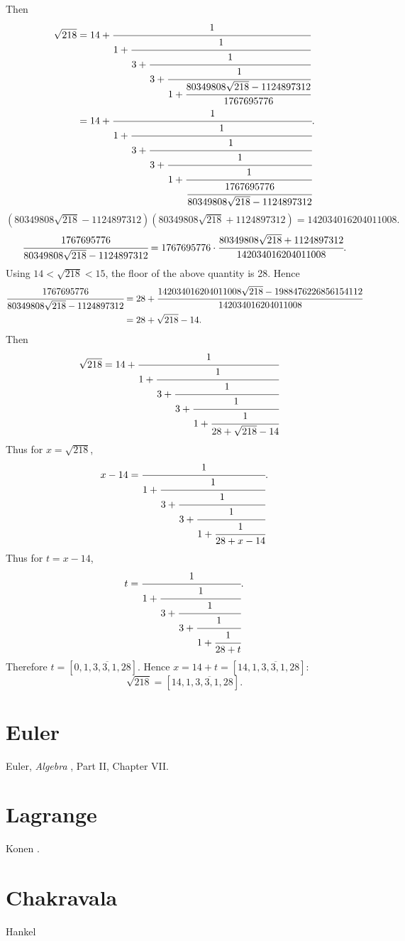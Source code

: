 \documentclass{article}
\theoremstyle{definition}
\begin{document}
Then
\begin{align*}
\sqrt{218} &= 
14+\cfrac{1}{1 + \cfrac{1}{3 + \cfrac{1}{3+\cfrac{1}{1
+\cfrac{80349808 \sqrt{218} -1124897312}{1767695776}}}}}\\
&=14+\cfrac{1}{1 + \cfrac{1}{3 + \cfrac{1}{3+\cfrac{1}{1
+\cfrac{1}{\cfrac{1767695776}{80349808 \sqrt{218} -1124897312}}}}}}.
\end{align*}
\[
(80349808 \sqrt{218} -1124897312)(80349808 \sqrt{218} +1124897312)=142034016204011008.
\]
\[
\cfrac{1767695776}{80349808 \sqrt{218} -1124897312} = 1767695776 \cdot \cfrac{80349808 \sqrt{218} +1124897312}{142034016204011008}.
\]
Using $14<\sqrt{218}<15$, the floor of the above quantity is 28. Hence
\begin{align*}
\cfrac{1767695776}{80349808 \sqrt{218} -1124897312}&=28 + \cfrac{142034016204011008 \sqrt{218} -1988476226856154112}{142034016204011008}\\
&=28+\sqrt{218}-14.
\end{align*}
Then
\begin{align*}
\sqrt{218}&=14+\cfrac{1}{1 + \cfrac{1}{3 + \cfrac{1}{3+\cfrac{1}{1
+\cfrac{1}{28+\sqrt{218}-14}}}}}
\end{align*}
Thus for $x=\sqrt{218}$,
\[
x-14 = \cfrac{1}{1 + \cfrac{1}{3 + \cfrac{1}{3+\cfrac{1}{1
+\cfrac{1}{28+x-14}}}}}.
\]
Thus for $t=x-14$,
\[
t = \cfrac{1}{1 + \cfrac{1}{3 + \cfrac{1}{3+\cfrac{1}{1
+\cfrac{1}{28+t}}}}}.
\]
Therefore $t=[0,\overline{1,3,3,1,28}]$.
Hence $x=14+t=[14,\overline{1,3,3,1,28}]$:
\[
\sqrt{218} = [14,\overline{1,3,3,1,28}].
\]




\section{Euler}
Euler, {\em Algebra} \cite{algebra}, Part II, Chapter VII.



\section{Lagrange}
Konen \cite[pp.~75--77]{konen}.







\section{Chakravala}
Hankel \cite[pp.~200--203]{hankel}
\end{document}
